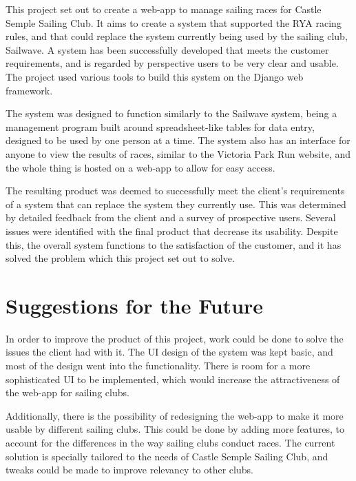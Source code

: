 \documentclass{l4proj}
\begin{document}
This project set out to create a web-app to manage sailing races for Castle Semple Sailing Club. It aims to create a system that supported the RYA racing rules, and that could replace the system currently being used by the sailing club, Sailwave. A system has been successfully developed that meets the customer requirements, and is regarded by perspective users to be very clear and usable. The project used various tools to build this system on the Django web framework. 

The system was designed to function similarly to the Sailwave system, being a management program built around spreadsheet-like tables for data entry, designed to be used by one person at a time. The system also has an interface for anyone to view the results of races, similar to the Victoria Park Run website, and the whole thing is hosted on a web-app to allow for easy access.

The resulting product was deemed to successfully meet the client's requirements of a system that can replace the system they currently use. This was determined by detailed feedback from the client and a survey of prospective users. Several issues were identified with the final product that decrease its usability. Despite this, the overall system functions to the satisfaction of the customer, and it has solved the problem which this project set out to solve.

\section{Suggestions for the Future}

In order to improve the product of this project, work could be done to solve the issues the client had with it. The UI design of the system was kept basic, and most of the design went into the functionality. There is room for a more sophisticated UI to be implemented, which would increase the attractiveness of the web-app for sailing clubs. 

Additionally, there is the possibility of redesigning the web-app to make it more usable by different sailing clubs. This could be done by adding more features, to account for the differences in the way sailing clubs conduct races. The current solution is specially tailored to the needs of Castle Semple Sailing Club, and tweaks could be made to improve relevancy to other clubs.

%
% 
\end{document}
